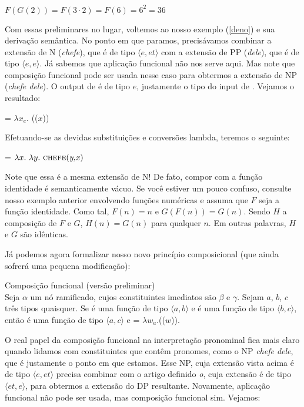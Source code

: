 \begin{exe}
	\ex $F(G(2)) = F(3 \cdot 2) = F(6) = 6^{2} = 36$
\end{exe}

Com essas preliminares no lugar, voltemos ao nosso exemplo (\ref{deno}) e sua derivação semântica. No ponto em que paramos, precisávamos combinar a extensão de N (\textit{chefe}), que é de tipo $\langle e,et\rangle$ com a extensão de PP (\textit{dele}), que é de tipo $\langle e,e\rangle$. Já sabemos que aplicação funcional não nos serve aqui. Mas note que composição funcional pode ser usada nesse caso para obtermos a extensão de NP (\textit{chefe dele}). O output de  é de tipo $e$, justamente o tipo do input de . Vejamos o resultado:

\begin{exe}
	\ex {} = $\lambda x_{e}.$ (($x$))
\end{exe}

\n Efetuando-se as devidas substituições e conversões lambda, teremos o seguinte:

\begin{exe}
	\ex {} = $\lambda x.\ \lambda y.\ \predica{chefe}{y,x}$
\end{exe}

\n Note que essa é a mesma extensão de N! De fato, compor com a função identidade é semanticamente vácuo. Se você estiver um pouco confuso, consulte nosso exemplo anterior envolvendo funções numéricas e assuma que $F$ seja a função identidade. Como tal, $F(n) = n$ e $G(F(n)) = G(n)$. Sendo $H$ a composição de $F$ e $G$, $H(n)=G(n)$ para qualquer $n$. Em outras palavras, $H$ e $G$ são idênticas.

Já podemos agora formalizar nosso novo princípio composicional (que ainda sofrerá uma pequena modificação):

\begin{exe}
	\ex Composição funcional (versão preliminar) \\
	Seja $\alpha$ um nó ramificado, cujos constituintes imediatos são $\beta$ e $\gamma$. Sejam $a$, $b$, $c$ três tipos  quaisquer. Se \den{$\beta$} é uma função de tipo $\langle a,b \rangle$ e \den{$\gamma$} é uma função de tipo $\langle b,c \rangle$, então \den{$\alpha$} é uma função de tipo $\langle a,c \rangle$ e \den{$\alpha$} = $\lambda w_{a}.$\den{$\gamma$}(\den{$\beta$}($w$)).
\end{exe}



\n O real papel da composição funcional na interpretação pronominal fica mais claro quando lidamos com constituintes que contêm pronomes, como o NP \textit{chefe dele}, que é justamente o ponto em que estamos. Esse NP, cuja extensão vista acima é de tipo $\langle e,et\rangle$ precisa combinar com o artigo definido \textit{o}, cuja extensão é de tipo $\langle et,e\rangle$, para obtermos a extensão do DP resultante. Novamente, aplicação funcional não pode ser usada, mas composição funcional sim. Vejamos:

